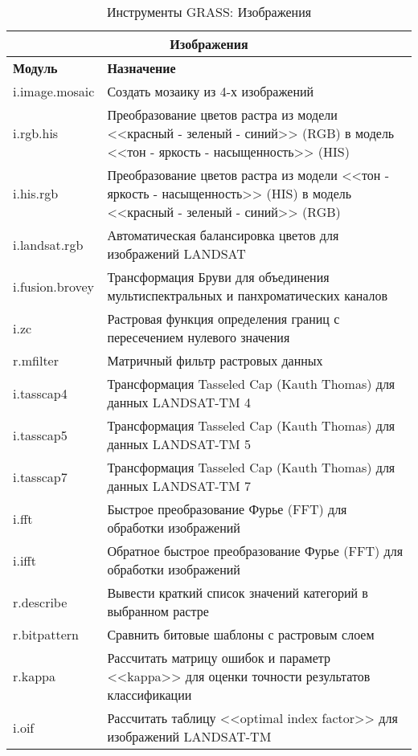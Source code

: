 {\renewcommand{\arraystretch}{0.7}
\begin{table}[H]
\centering
 \begin{tabular}{|p{4cm}|p{11cm}|}
  \hline \multicolumn{2}{|c|}{\textbf{Изображения}} \\
  \hline \textbf{Модуль} & \textbf{Назначение} \\
  \hline i.image.mosaic & Создать мозаику из 4-х изображений \\
  \hline i.rgb.his & Преобразование цветов растра из модели
  <<красный - зеленый - синий>> (RGB) в модель <<тон - яркость - насыщенность>> (HIS) \\
  \hline i.his.rgb & Преобразование цветов растра из модели
  <<тон - яркость - насыщенность>> (HIS) в модель <<красный - зеленый - синий>> (RGB) \\
  \hline i.landsat.rgb & Автоматическая балансировка цветов для
  изображений LANDSAT \\
  \hline i.fusion.brovey & Трансформация Бруви для объединения
  мультиспектральных и панхроматических каналов \\
  \hline i.zc & Растровая функция определения границ с пересечением
  нулевого значения \\
  \hline r.mfilter &  Матричный фильтр растровых данных \\
  \hline i.tasscap4 & Трансформация Tasseled Cap (Kauth Thomas) для
  данных LANDSAT-TM 4 \\
  \hline i.tasscap5 & Трансформация Tasseled Cap (Kauth Thomas) для
  данных LANDSAT-TM 5 \\
  \hline i.tasscap7 & Трансформация Tasseled Cap (Kauth Thomas) для
  данных LANDSAT-TM 7 \\
  \hline i.fft & Быстрое преобразование Фурье (FFT) для обработки
  изображений \\
  \hline i.ifft & Обратное быстрое преобразование Фурье (FFT) для обработки
  изображений \\
  \hline r.describe & Вывести краткий список значений категорий в
  выбранном растре \\
  \hline r.bitpattern & Сравнить битовые шаблоны с растровым слоем \\
  \hline r.kappa & Рассчитать матрицу ошибок и параметр <<kappa>> для
  оценки точности результатов классификации \\
  \hline i.oif & Рассчитать таблицу <<optimal index factor>> для
  изображений LANDSAT-TM \\
\hline
\end{tabular}
\caption{Инструменты GRASS: Изображения}
\end{table}}

